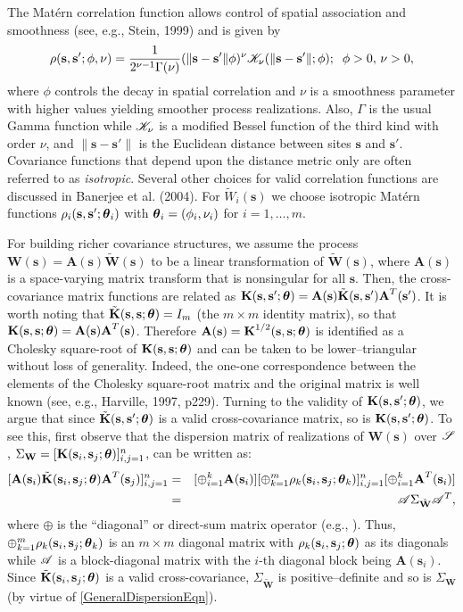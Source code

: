 \documentclass[a4paper]{article}
\newcommand{\btheta}{ \mbox{\boldmath $ \theta $} }
\newcommand{\bA}{\textbf{A}}
\newcommand{\bK}{\textbf{K}}
\newcommand{\bs}{\textbf{s}}
\newcommand{\bW}{\textbf{W}}
\begin{document}
The Mat\'{e}rn correlation function allows control of spatial
association and smoothness (see, e.g., Stein, 1999) and is given by
\begin{equation}\label{Matern} \rho(\bs,\bs';\phi,\nu) =
\frac{1}{2^{\nu-1}\Gamma(\nu) }(\|\bs-\bs'\|\phi)^{\nu}{\cal
K}_{\nu}(\|\bs-\bs'\|;\phi);\;\; \phi > 0,\,\nu > 0,
\end{equation}
where $\phi$ controls the decay in spatial correlation and $\nu$ is
a smoothness parameter with higher values yielding smoother process
realizations. Also, $\Gamma$ is the usual Gamma function while
${\cal K}_{\nu}$ is a modified Bessel function of the third kind
with order $\nu$, and $\|\bs-\bs'\|$ is the Euclidean distance
between sites $\bs$ and $\bs'$. Covariance functions that depend
upon the distance metric only are often referred to as
\emph{isotropic}. Several other choices for valid correlation
functions are discussed in Banerjee et al. (2004). For $\tilde{W}_i(\bs)$ we
choose isotropic Mat\'ern functions $\rho_i(\bs,\bs';\btheta_i)$
with $\btheta_i=(\phi_i,\nu_i)$ for $i=1,\ldots,m$.

For building richer covariance structures, we assume the process
$\bW(\bs)= \bA(\bs)\tilde{\bW}(\bs)$ to be a linear transformation
of $\tilde{\bW}(\bs)$, where $\bA(\bs)$ is a space-varying matrix
transform that is nonsingular for all $\bs$. Then, the
cross-covariance matrix functions are related as
$\bK(\bs,\bs';\btheta) =
\bA(\bs)\tilde{\bK}(\bs,\bs')\bA^{T}(\bs')$. It is worth noting that
$\tilde{\bK}(\bs,\bs;\btheta)=I_{m}$ (the $m\times m$ identity
matrix), so that $\bK(\bs,\bs;\btheta) = \bA(\bs)\bA^{T}(\bs)$.
Therefore $\bA(\bs)=\bK^{1/2}(\bs,\bs;\btheta)$ is identified as a
Cholesky square-root of $\bK(\bs,\bs;\btheta)$ and can be
taken to be lower--triangular without loss of generality. Indeed,
the one-one correspondence between the elements of the Cholesky
square-root matrix and the original matrix is well known (see, e.g.,
Harville, 1997, p229). Turning to the validity of
$\bK(\bs,\bs';\btheta)$, we argue that since
$\tilde{\bK}(\bs,\bs';\btheta)$ is a valid cross-covariance matrix,
so is $\bK(\bs,\bs';\btheta)$. To see this, first observe that the
dispersion matrix of realizations of $\bW(\bs)$ over ${\cal S}$,
$\Sigma_{\bW} = [\bK(\bs_i,\bs_j;\btheta)]_{i,j=1}^{n}$, can be
written as:
\begin{eqnarray}\label{GeneralDispersionEqn}
\nonumber[\bA(\bs_i)\tilde{\bK}(\bs_i,\bs_j;\btheta)\bA^{T}(\bs_j)]_{i,j=1}^{n}&=&[\oplus_{i=1}^{k}\bA(\bs_i)][\oplus_{k=1}^{m}\rho_k(\bs_i,\bs_j;\btheta_k)]_{i,j=1}^{n}[\oplus_{i=1}^{k}\bA^{T}(\bs_i)]\\
&=&{\cal A}\Sigma_{\tilde{\bW}}{\cal A}^{T},
\end{eqnarray}
where $\oplus$ is the ``diagonal'' or direct-sum matrix operator
(e.g., \cite{bH97a}).  Thus, $\oplus_{k=1}^{m}\rho_k(\bs_i,\bs_j;\btheta_k)$ is an $m\times m$
diagonal  matrix with $\rho_k(\bs_i,\bs_j;\btheta)$ as its diagonals
while ${\cal A}$ is a block-diagonal matrix with the $i$-th diagonal
block being $\bA(\bs_i)$. Since $\tilde{\bK}(\bs_i,\bs_j;\btheta)$ is a valid cross-covariance, $\Sigma_{\tilde{\bW}}$ is
positive--definite and so is $\Sigma_{\bW}$ (by virtue of \ref{GeneralDispersionEqn}).
\end{document}
